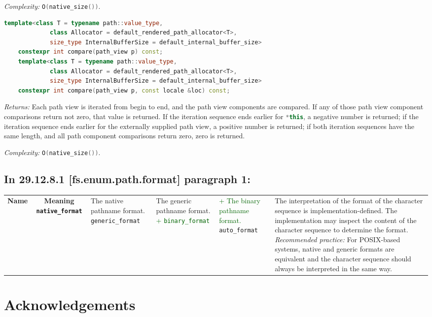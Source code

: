 \documentclass[11pt]{article}
\newcommand{\code}[2][cpp]{\lstinline[language=#1,basicstyle=\small\ttfamily]{#2}}
\newcommand{\desc}[1]{\textit{#1}}
\newcommand{\returns}{\desc{Returns: }}
\newcommand{\complexity}{\desc{Complexity: }}
\newcommand{\tsrefp}[3]{\subsection*{In #2 \textbf{[#1]} paragraph #3:}}
\newcommand{\tsreplace}[3]{\textcolor{red}{\sout{#1}}#2\textcolor{darkgreen}{#3}}
\begin{document}
\complexity \code{O(native_size())}.\\

\begin{lstlisting}[language=cpp]
    template<class T = typename path::value_type,
             class Allocator = default_rendered_path_allocator<T>,
             size_type InternalBufferSize = default_internal_buffer_size>
    constexpr int compare(path_view p) const;
    template<class T = typename path::value_type,
             class Allocator = default_rendered_path_allocator<T>,
             size_type InternalBufferSize = default_internal_buffer_size>
    constexpr int compare(path_view p, const locale &loc) const;
\end{lstlisting}

\returns Each path view is iterated from begin to end, and the path view components are compared. If any of those path view component comparisons return not zero, that value is returned. If the iteration sequence ends earlier for \code{*this}, a negative number is returned; if the iteration sequence ends earlier for the externally supplied path view, a positive number is returned; if both iteration sequences have the same length, and all path component comparisons return zero, zero is returned.

\complexity \code{O(native_size())}.\\

\tsrefp{fs.enum.path.format}{29.12.8.1}{1}

\color{black}

\begin{center}
\begin{tabular}{|c c|}
\hline
\bf{Name} & \bf{Meaning}
\hline
\code{native_format} &
The native pathname format.
\hline
\code{generic_format} &
The generic pathname format.
\hline
\color{darkgreen}
\tsreplace{}{}{+ \code{binary_format}} &
\tsreplace{}{}{+ The binary pathname format.}
\hline
\color{black}
\code{auto_format} &
The interpretation of the format of the character sequence is implementation-defined.
The implementation may inspect the content of the character sequence to determine the format.
\emph{Recommended practice:} For POSIX-based systems, native and generic formats are equivalent and the character sequence should always be interpreted in the same way.
\hline
\end{tabular}
\end{center}

\color{black}

\section{Acknowledgements}
\end{document}
